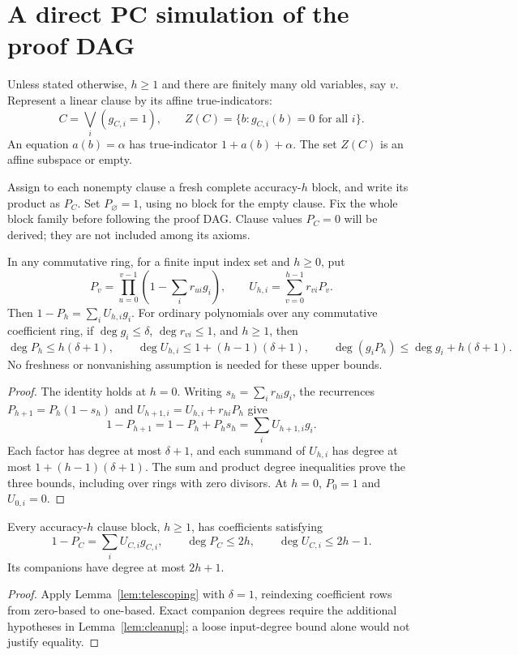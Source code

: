 \section{A direct PC simulation of the proof DAG}\label{sec:clause-simulation}

Unless stated otherwise, \(h\ge1\) and there are finitely many old
variables, say \(v\). Represent a linear clause by its affine true-indicators:
\[
 C=\bigvee_i(g_{C,i}=1),\qquad
 Z(C)=\{b:g_{C,i}(b)=0\text{ for all }i\}.
\]
An equation \(a(b)=\alpha\) has true-indicator \(1+a(b)+\alpha\).
The set \(Z(C)\) is an affine subspace or empty.

Assign to each nonempty clause a fresh complete accuracy-\(h\) block,
and write its product as \(P_C\). Set \(P_\varnothing=1\), using no
block for the empty clause.  Fix the whole block family before following
the proof DAG. Clause values \(P_C=0\) will be derived; they are not
included among its axioms.

\begin{lemma}\label{lem:telescoping}
In any commutative ring, for a finite input index set and \(h\ge0\), put
\[
 P_v=\prod_{u=0}^{v-1}\left(1-\sum_i r_{ui}g_i\right),\qquad
 U_{h,i}=\sum_{v=0}^{h-1}r_{vi}P_v.
\]
Then \(1-P_h=\sum_i U_{h,i}g_i\).
For ordinary polynomials over any commutative coefficient ring, if
\(\deg g_i\le\delta\), \(\deg r_{vi}\le1\), and \(h\ge1\), then
\[
 \deg P_h\le h(\delta+1),\qquad
 \deg U_{h,i}\le1+(h-1)(\delta+1),\qquad
 \deg(g_iP_h)\le\deg g_i+h(\delta+1).
\]
No freshness or nonvanishing assumption is needed for these upper bounds.
\end{lemma}
\begin{proof}
The identity holds at \(h=0\). Writing \(s_h=\sum_i r_{hi}g_i\), the
recurrences \(P_{h+1}=P_h(1-s_h)\) and
\(U_{h+1,i}=U_{h,i}+r_{hi}P_h\) give
\[
 1-P_{h+1}=1-P_h+P_hs_h=\sum_i U_{h+1,i}g_i.
\]
Each factor has degree at most \(\delta+1\), and each summand of
\(U_{h,i}\) has degree at most \(1+(h-1)(\delta+1)\).
The sum and product degree inequalities prove the three bounds, including
over rings with zero divisors. At \(h=0\), \(P_0=1\) and \(U_{0,i}=0\).
\end{proof}

\begin{corollary}\label{lem:prefix}
Every accuracy-\(h\) clause block, \(h\ge1\), has coefficients satisfying
\begin{equation}\label{eq:prefix}
 1-P_C=\sum_iU_{C,i}g_{C,i},\qquad
 \deg P_C\le2h,\qquad\deg U_{C,i}\le2h-1.
\end{equation}
Its companions have degree at most \(2h+1\).
\end{corollary}
\begin{proof}
Apply Lemma~\ref{lem:telescoping} with \(\delta=1\), reindexing coefficient
rows from zero-based to one-based. Exact companion degrees require the
additional hypotheses in Lemma~\ref{lem:cleanup}; a loose input-degree
bound alone would not justify equality.
\end{proof}

